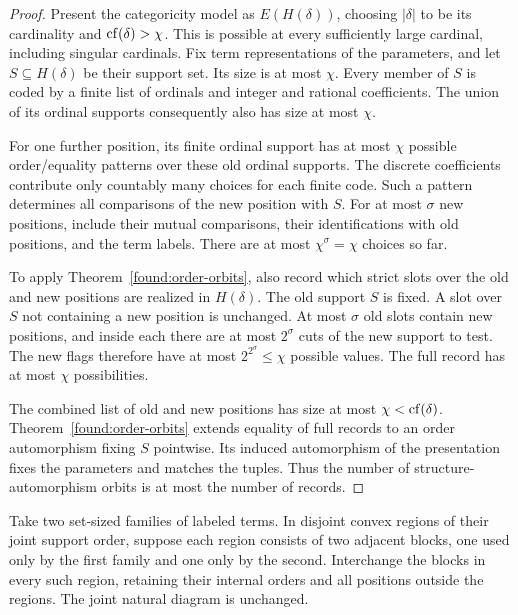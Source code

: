 \begin{proof}
Present the categoricity model as \(E(H(\delta))\), choosing
\(|\delta|\) to be its cardinality and \(\operatorname{cf}(\delta)>\chi\).
This is possible at every sufficiently large cardinal, including
singular cardinals. Fix term representations of the parameters,
and let \(S\subseteq H(\delta)\) be their support set. Its size
is at most \(\chi\). Every member of \(S\) is coded by a finite
list of ordinals and integer and rational coefficients. The union
of its ordinal supports consequently also has size at most
\(\chi\).

For one further position, its finite ordinal support has at most
\(\chi\) possible order/equality patterns over these old ordinal
supports. The discrete coefficients contribute only countably
many choices for each finite code. Such a pattern determines
all comparisons of the new position with \(S\). For at most
\(\sigma\) new positions, include their mutual comparisons,
their identifications with old positions, and the term labels.
There are at most \(\chi^\sigma=\chi\) choices so far.

To apply Theorem~\ref{found:order-orbits}, also record which strict
slots over the old and new positions are realized in
\(H(\delta)\). The old support \(S\) is fixed. A slot over \(S\)
not containing a new position is unchanged. At most \(\sigma\)
old slots contain new positions, and inside each there are at
most \(2^\sigma\) cuts of the new support to test. The new flags
therefore have at most \(2^{2^\sigma}\le\chi\) possible values.
The full record has at most \(\chi\) possibilities.

The combined list of old and new positions has size at most
\(\chi<\operatorname{cf}(\delta)\). Theorem~\ref{found:order-orbits} extends
equality of full records to an order automorphism fixing \(S\)
pointwise. Its induced automorphism of the presentation fixes
the parameters and matches the tuples. Thus the number of
structure-automorphism orbits is at most the number of records.
\end{proof}

\begin{lemma}
\label{lev:block-transpositions}
Take two set-sized families of labeled terms. In disjoint convex
regions of their joint support order, suppose each region consists
of two adjacent blocks, one used only by the first family and one
only by the second. Interchange the blocks in every such region,
retaining their internal orders and all positions outside the
regions. The joint natural diagram is unchanged.
\end{lemma}

